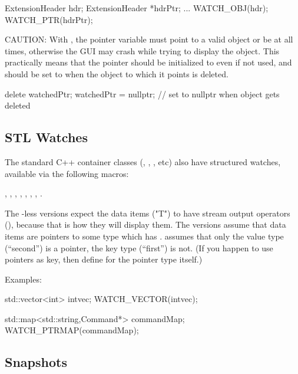 \begin{cpp}
ExtensionHeader hdr;
ExtensionHeader *hdrPtr;
...
WATCH_OBJ(hdr);
WATCH_PTR(hdrPtr);
\end{cpp}

CAUTION: With , the pointer variable must point to a valid
object or be  at all times, otherwise the GUI may crash
while trying to display the object. This practically means that
the pointer should be initialized to  even if not used, and
should be set to  when the object to which it points is deleted.

\begin{cpp}
delete watchedPtr;
watchedPtr = nullptr;  // set to nullptr when object gets deleted
\end{cpp}


\subsection{STL Watches}
\label{sec:sim-lib:stl-watches}

The standard C++ container classes (, , , etc)
also have structured watches, available via the following macros:

, ,
, ,
, ,
, .

The -less versions expect the data items ("T") to have
stream output operators (), because that is how
they will display them. The  versions assume that
data items are pointers to some type which has .
 assumes that only the value type (``second'')
is a pointer, the key type (``first'') is not. (If you happen to use
pointers as key, then define  for the pointer type
itself.)

Examples:

\begin{cpp}
std::vector<int> intvec;
WATCH_VECTOR(intvec);

std::map<std::string,Command*> commandMap;
WATCH_PTRMAP(commandMap);
\end{cpp}



\subsection{Snapshots}
\label{sec:sim-lib:snapshots}


